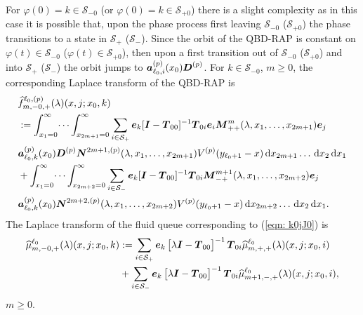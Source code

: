 For \(\varphi(0)=k\in\mathcal S_{-0}\) (or \(\varphi(0)=k\in\mathcal S_{+0}\)) there is a slight complexity as in this case it is possible that, upon the phase process first leaving \(\mathcal S_{-0}\) (\(\mathcal S_{+0}\)) the phase transitions to a state in \(\mathcal S_+\) (\(\mathcal S_-\)). Since the orbit of the QBD-RAP is constant on \(\varphi(t)\in\mathcal S_{-0}\) (\(\varphi(t)\in\mathcal S_{+0}\)), then upon a first transition out of \(\mathcal S_{-0}\) (\(\mathcal S_{+0}\)) and into \(\mathcal S_+\) (\(\mathcal S_-\)) the orbit jumps to \(\boldsymbol   a_{\ell_0,i}^{(p)}(x_0)\boldsymbol D^{(p)}\). For \(k\in\mathcal S_{-0}\), \(m\geq 0\), the corresponding Laplace transform of the QBD-RAP is
\begin{align}
	&\widehat{f}_{m,-0,+}^{\ell_0,(p)}(\lambda)(x,j;x_0,k)\nonumber 
	\\&:=\int_{x_1=0}^\infty \dots \int_{x_{2m+1}=0}^\infty \sum_{i\in\mathcal{S}_+} \boldsymbol e_k [\boldsymbol I - \boldsymbol T_{00}]^{-1}\boldsymbol T_{0i}\boldsymbol e_i\boldsymbol M^m_{++}(\lambda,x_1,\dots,x_{2m+1})\boldsymbol e_j \nonumber
	\\& \boldsymbol a_{\ell_0,k}^{(p)}(x_0) \boldsymbol D^{(p)} \boldsymbol N^{2m+1,(p)}(\lambda,x_1,\dots,x_{2m+1}) V^{(p)}(y_{\ell_0+1}-x)\, \mathrm{d} x_{2m+1}\dots\, \mathrm{d} x_2 \, \mathrm{d} x_1  \nonumber
	\\& + \int_{x_1=0}^\infty \dots \int_{x_{2m+2}=0}^\infty \sum_{i\in\mathcal{S}_-} \boldsymbol e_k [\boldsymbol I - \boldsymbol T_{00}]^{-1}\boldsymbol T_{0i}\boldsymbol M^{m+1}_{-+}(\lambda,x_1,\dots,x_{2m+2})\boldsymbol e_j \nonumber
	\\& \boldsymbol a_{\ell_0,k}^{(p)}(x_0)\boldsymbol N^{2m+2,(p)}(\lambda,x_1,\dots,x_{2m+2}) V^{(p)}(y_{\ell_0+1}-x)\, \mathrm{d} x_{2m+2}\dots\, \mathrm{d} x_2 \, \mathrm{d} x_1.
	\label{eqn: k0jJ0}
\end{align}
The Laplace transform of the fluid queue corresponding to (\ref{eqn: k0jJ0}) is 
\begin{align}
	\widehat \mu_{m,-0,+}^{\ell_0}(\lambda)(x,j;x_0,k) \nonumber 
	&:= \sum_{i\in\mathcal{S}_+}\boldsymbol e_k\begin{bmatrix} \lambda \boldsymbol I - \boldsymbol T_{00} \end{bmatrix}^{-1}\boldsymbol T_{0i}\widehat \mu_{m,+,+}^{\ell_0}(\lambda)(x,j;x_0,i) 
	\\&{}+ \sum_{i\in\mathcal{S}_-}\boldsymbol e_k\begin{bmatrix} \lambda \boldsymbol I - \boldsymbol T_{00} \end{bmatrix}^{-1}\boldsymbol T_{0i}\widehat \mu_{m+1,-,+}^{\ell_0}(\lambda)(x,j;x_0,i), \label{eqn: s0- actual}
\end{align}
\(m\geq 0\).

